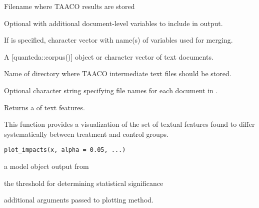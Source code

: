 \documentclass[a4paper]{book}
\begin{document}
\begin{Arguments}
\begin{ldescription}
\item[\code{file}] Filename where TAACO results are stored

\item[\code{data}] Optional  with additional document-level variables to include in output.

\item[\code{idvar}] If  is specified, character vector with name(s) of variables used for merging.

\item[\code{x}] A [quanteda::corpus()] object or character vector of text documents.

\item[\code{dir}] Name of directory where TAACO intermediate text files should be stored.

\item[\code{docnames}] Optional character string specifying file names for each document in .
\end{ldescription}
\end{Arguments}
%
\begin{Value}
Returns a  of text features.
\end{Value}
%
\begin{Description}\relax
This function provides a visualization of the set of textual features
found to differ systematically between treatment and control groups.
\end{Description}
%
\begin{Usage}
\begin{verbatim}
plot_impacts(x, alpha = 0.05, ...)
\end{verbatim}
\end{Usage}
%
\begin{Arguments}
\begin{ldescription}
\item[\code{x}] a model object output from 

\item[\code{alpha}] the threshold for determining statistical significance

\item[\code{...}] additional arguments passed to plotting method.
\end{ldescription}
\end{Arguments}
\end{document}
